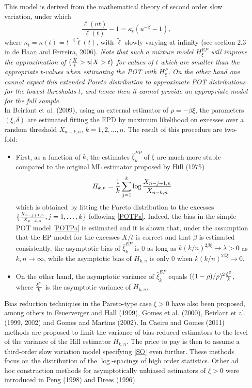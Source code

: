 \documentclass[a4paper,11pt]{article}
\begin{document}
 This model is derived from the mathematical theory of second order slow variation, under which 
\begin{equation}
\frac{\ell(ut)}{\ell (t)} - 1 =\kappa_t 
\left( u^{-\beta}-1 \right),
\label{SO}
\end{equation}
where $\kappa_t=\kappa (t)= t^{-\beta}\tilde{\ell}(t)$, with $\tilde\ell$ slowly varying at infinity (see section 2.3 in de Haan and Ferreira, 2006). {\it Note  that such a mixture model  $H_{\xi}^{EP}$ will improve the approximation of  $\left( {X \over t} >u | X>t \right)$ for values of $t$ which are smaller than the appropriate $t$-values when estimating the POT with $H_{\xi}^{P}$. On the other hand one cannot expect this extended Pareto distribution to approximate POT distributions for the lowest thresholds $t$, and hence then it cannot provide an appropriate model for the full sample.} 
\\
In Beirlant et al. (2009), using an external estimator  of $\rho=-\beta\xi$, the parameters $(\xi, \delta)$ are estimated fitting the EPD by maximum likelihood on excesses over a random threshold $X_{n-k,n}$, $k=1,2,\ldots,n$. 
The result of this procedure are two-fold:
\begin{itemize}
\item First, as a function of $k$, the estimates $\hat{\xi}_k^{EP}$ of $\xi$ are much more stable compared to the original ML estimator proposed by Hill (1975)
$$
H_{k,n} = {1 \over k} \sum_{j=1}^k \log {X_{n-j+1,n}\over X_{n-k,n}}
$$
 which is obtained by fitting the Pareto distribution to the excesses 
 $\{ {X_{n-j+1,n}\over X_{n-k,n}}, j=1,\ldots,k\}$ following \eqref{POTPa}. Indeed, the bias in the simple POT model \eqref{POTPa} is estimated and it is shown that, under the assumption that the EP model for the excesses $X/t$ is correct and that $\beta$ is estimated consistently,  the asymptotic bias of  $\hat{\xi}_k^{EP}$ is 0 as long as  $k (k/n)^{2\beta\xi} \to \lambda >0$ as $k,n \to \infty$, while the asymptotic bias of $H_{k,n}$ is only 0 when $k (k/n)^{2\beta\xi} \to 0$.
 \item On the other hand,  the asymptotic variance of $\hat{\xi}_k^{EP}$ equals $((1-\rho)/\rho)^2 {\xi^2 \over k}$, where ${\xi^2 \over k}$ is the asymptotic variance of $H_{k,n}$. 
\end{itemize}
Bias reduction techniques in the Pareto-type case $\xi >0$ have also been proposed, among others in Feuerverger and Hall (1999), Gomes et al. (2000), Beirlant et al. (1999, 2002) and Gomes and Martins (2002). In Caeiro and Gomes (2011) methods are proposed to limit the variance of bias-reduced estimators to the level of the variance of the Hill estimator $H_{k,n}$. The price to pay is then to assume a third-order slow variation model specifying \eqref{SO} even further. These methods focus on the distribution of the $\log$-spacings of high order statistics.  Other ad hoc construction methods for asymptotically unbiased estimators of $\xi >0$ were introduced in Peng (1998) and Drees (1996).
\\
\end{document}
